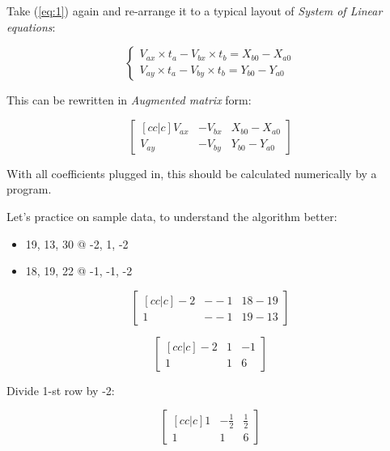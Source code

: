 \documentclass{article}
\begin{document}
Take (\ref{eq:1}) again and re-arrange it to a typical layout of \emph{System of Linear equations}:

\begin{displaymath}
    \begin{cases}
        V_{ax} \times t_a - V_{bx} \times t_b = X_{b0} - X_{a0} \\
        V_{ay} \times t_a - V_{by} \times t_b = Y_{b0} - Y_{a0}
    \end{cases}
\end{displaymath}

This can be rewritten in \emph{Augmented matrix} form:

\begin{displaymath}
\begin{bmatrix}[cc|c]
    V_{ax} & - V_{bx} & X_{b0} - X_{a0} \\
    V_{ay} & - V_{by} & Y_{b0} - Y_{a0}
\end{bmatrix}
\end{displaymath}

With all coefficients plugged in, this should be calculated numerically by a program.

Let's practice on sample data, to understand the algorithm better:

\begin{itemize}
\item 19, 13, 30 @ -2, 1, -2
\item 18, 19, 22 @ -1, -1, -2
\end{itemize}

\begin{displaymath}
    \begin{bmatrix}[cc|c]
        -2 & - -1 & 18 - 19 \\
         1 & - -1 & 19 - 13
    \end{bmatrix}
\end{displaymath}


\begin{displaymath}
    \begin{bmatrix}[cc|c]
        -2 & 1 & -1 \\
         1 & 1 &  6
    \end{bmatrix}
\end{displaymath}

Divide 1-st row by -2:

\begin{displaymath}
    \begin{bmatrix}[cc|c]
         1 & -\frac{1}{2} & \frac{1}{2} \\
         1 & 1 &  6
    \end{bmatrix}
\end{displaymath}
\end{document}
